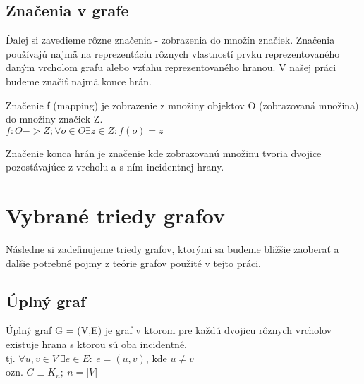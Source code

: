 %  




\subsection{Značenia v grafe}
Ďalej si zavedieme rôzne značenia - zobrazenia do množín značiek. Značenia používajú najmä na reprezentáciu rôznych vlastností prvku reprezentovaného daným vrcholom grafu alebo vzťahu reprezentovaného hranou. V našej práci budeme značiť najmä konce hrán.\\

\begin{defin}
Značenie f (mapping) je zobrazenie z množiny objektov O (zobrazovaná množina) do množiny značiek Z.\\
$f: O -> Z ; \forall o \in O  \exists z \in Z  : f(o)=z$
\end{defin}

\begin{defin}
Značenie konca hrán je značenie kde zobrazovanú množinu tvoria dvojice pozostávajúce z vrcholu a s ním incidentnej hrany.
\end{defin}

\section{Vybrané triedy grafov}
Následne si zadefinujeme triedy grafov, ktorými sa budeme bližšie zaoberať a ďalšie potrebné pojmy z teórie grafov použité v tejto práci. 

\subsection{Úplný graf}
\begin{defin}
Úplný graf G = (V,E) je graf v ktorom pre každú dvojicu rôznych vrcholov existuje hrana s ktorou sú oba incidentné.\\
tj. $\forall u,v \in V\ \exists e \in  E :\ e=(u,v)$, kde $u \neq v$\\
ozn. $G \equiv K_n;\ n=|V|$
\end{defin}
